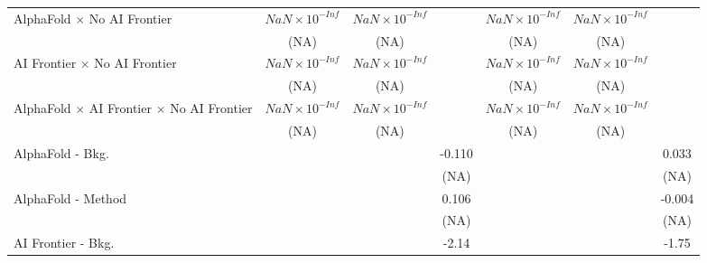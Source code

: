 \begin{tabular}{lcccccc}
   AlphaFold $\times$ No AI Frontier                                          & $NaN\times 10^{-Inf}$  & $NaN\times 10^{-Inf}$  &                        & $NaN\times 10^{-Inf}$  & $NaN\times 10^{-Inf}$  &   \\   
                                                                              & (NA)                   & (NA)                   &                        & (NA)                   & (NA)                   &   \\   
   AI Frontier $\times$ No AI Frontier                                        & $NaN\times 10^{-Inf}$  & $NaN\times 10^{-Inf}$  &                        & $NaN\times 10^{-Inf}$  & $NaN\times 10^{-Inf}$  &   \\   
                                                                              & (NA)                   & (NA)                   &                        & (NA)                   & (NA)                   &   \\   
   AlphaFold $\times$ AI Frontier $\times$ No AI Frontier                     & $NaN\times 10^{-Inf}$  & $NaN\times 10^{-Inf}$  &                        & $NaN\times 10^{-Inf}$  & $NaN\times 10^{-Inf}$  &   \\   
                                                                              & (NA)                   & (NA)                   &                        & (NA)                   & (NA)                   &   \\   
   AlphaFold - Bkg.                                                           &                        &                        & -0.110                 &                        &                        & 0.033\\   
                                                                              &                        &                        & (NA)                   &                        &                        & (NA)\\   
   AlphaFold - Method                                                         &                        &                        & 0.106                  &                        &                        & -0.004\\   
                                                                              &                        &                        & (NA)                   &                        &                        & (NA)\\   
   AI Frontier - Bkg.                                                         &                        &                        & -2.14                  &                        &                        & -1.75\\   

\end{tabular}
